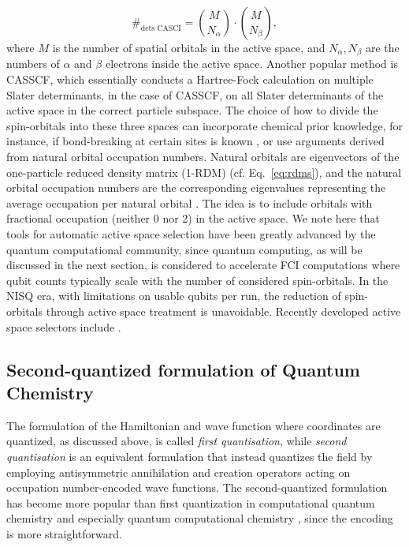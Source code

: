\documentclass[../main.tex]{subfiles}
\begin{document}
\begin{equation}
    \#_\text{dets CASCI} = \binom{M}{N_\alpha}\cdot\binom{M}{N_\beta},
\end{equation} where $M$ is the number of spatial orbitals in the active space, and $N_\alpha, N_\beta$ are the numbers of $\alpha$ and $\beta$ electrons inside the active space. Another popular method is \ac{CASSCF}, which essentially conducts a Hartree-Fock calculation on multiple Slater determinants, in the case of CASSCF, on all Slater determinants of the active space in the correct particle subspace. The choice of how to divide the spin-orbitals into these three spaces can incorporate chemical prior knowledge, for instance, if bond-breaking at certain sites is known \cite{levine2021cas}, or use arguments derived from natural orbital occupation numbers. Natural orbitals are eigenvectors of the one-particle reduced density matrix (1-RDM) (cf. Eq.~\ref{eq:rdms}), and the natural orbital occupation numbers are the corresponding eigenvalues representing the average occupation per natural orbital \cite{helgaker2014molecular}. The idea is to include orbitals with fractional occupation (neither 0 nor 2) in the active space. We note here that tools for automatic active space selection have been greatly advanced by the quantum computational community, since quantum computing, as will be discussed in the next section, is considered to accelerate FCI computations where qubit counts typically scale with the number of considered spin-orbitals. In the NISQ era, with limitations on usable qubits per run, the reduction of spin-orbitals through active space treatment is unavoidable. Recently developed active space selectors include \cite{2025activespacefinder, tarocco2025aegiss}.


\subsection{Second-quantized formulation of Quantum Chemistry}\label{sec:secquant}

The formulation of the Hamiltonian and wave function where coordinates are quantized, as discussed above, is called \textit{first quantisation}, while  \textit{second quantisation} is an equivalent formulation that instead quantizes the field by employing antisymmetric annihilation and creation operators acting on occupation number-encoded wave functions. The second-quantized formulation has become more popular than first quantization in computational quantum chemistry and especially quantum computational chemistry \cite{mcardle2020quantum}, since the encoding is more straightforward.
\end{document}
